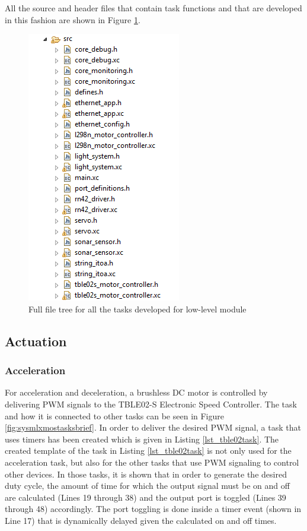 All the source and header files that contain task functions and that are developed in this fashion are shown in Figure \ref{fig:fullfiletree}.
\begin{figure}[!ht]
	\centering
	\captionsetup{justification=centering}
	\includegraphics[scale=0.8]{content/images/fullfiletree.png}
	\caption{Full file tree for all the tasks developed for low-level module}
	\label{fig:fullfiletree}
\end{figure}

\subsection{Actuation}
\subsubsection{Acceleration} \label{accelerationsection}
For acceleration and deceleration, a brushless DC motor is controlled by delivering PWM signals to the TBLE02-S Electronic Speed Controller. The task and how it is connected to other tasks can be seen in Figure \ref{fig:sysmlxmostasksbrief}. In order to deliver the desired PWM signal, a task that uses timers has been created which is given in Listing \ref{lst_tble02task}. The created template of the task in Listing \ref{lst_tble02task} is not only used for the acceleration task, but also for the other tasks that use PWM signaling to control other devices. In those tasks, it is shown that in order to generate the desired duty cycle, the amount of time for which the output signal must be on and off are calculated (Lines 19 through 38) and the output port is toggled (Lines 39 through 48) accordingly. The port toggling is done inside a timer event (shown in Line 17) that is dynamically delayed given the calculated on and off times.

